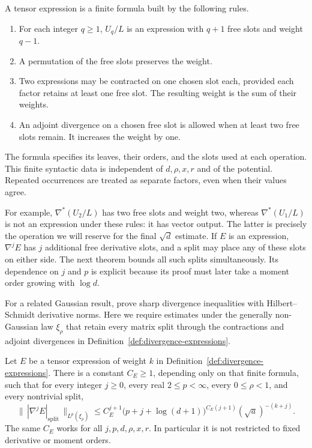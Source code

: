 \begin{definition}
\label{def:divergence-expressions}
A tensor expression is a finite formula built by the following rules.
\begin{enumerate}
 \item For each integer $q\ge1$, $U_q/L$ is an expression with $q+1$
       free slots and weight $q-1$.
 \item A permutation of the free slots preserves the weight.
 \item Two expressions may be contracted on one chosen slot each,
       provided each factor retains at least one free slot.  The
       resulting weight is the sum of their weights.
 \item An adjoint divergence on a chosen free slot is allowed when
       at least two free slots remain.  It increases the weight by one.
\end{enumerate}
The formula specifies its leaves, their orders, and the slots used at
each operation.  This finite syntactic data is independent of
$d,\rho,x,r$ and of the potential.  Repeated occurrences are treated
as separate factors, even when their values agree.
\end{definition}

For example, $\nabla^*(U_2/L)$ has two free slots and weight two,
whereas $\nabla^*(U_1/L)$ is not an expression under these rules:
it has vector output.  The latter is precisely the operation we will
reserve for the final $\sqrt d$ estimate.  If $E$ is an expression,
$\nabla^jE$ has $j$ additional free derivative slots, and a split may
place any of these slots on either side.  The next theorem bounds all
such splits simultaneously.  Its dependence on $j$ and $p$ is explicit
because its proof must later take a moment order growing with $\log d$.

For a related Gaussian result,
\citet[Theorem~1.1 and Corollary~1.4]{chen2026divergence} prove sharp
divergence inequalities with Hilbert--Schmidt derivative norms. Here we
require estimates under the generally non-Gaussian law $\xi_\rho$ that
retain every matrix split through the contractions and adjoint divergences
in Definition~\ref{def:divergence-expressions}.

\begin{theorem}
\label{thm:tensor-divergence}
Let $E$ be a tensor expression of weight $k$ in
Definition~\ref{def:divergence-expressions}.  There is a constant
$C_E\ge1$, depending only on that finite formula, such that for
every integer $j\ge0$, every real $2\le p<\infty$,
every $0\le\rho<1$, and every nontrivial split,
\begin{equation}
 \bigl\|\,|\nabla^jE|_{\mathrm{split}}\,\bigr\|_{L^p(\xi_\rho)}
 \le C_E^{j+1}
       \bigl(p+j+\log(d+1)\bigr)^{C_E(j+1)}
       (\sqrt a)^{-(k+j)}.
 \label{eq:network}
\end{equation}
The same $C_E$ works for all $j,p,d,\rho,x,r$.  In particular it is
not restricted to fixed derivative or moment orders.
\end{theorem}

